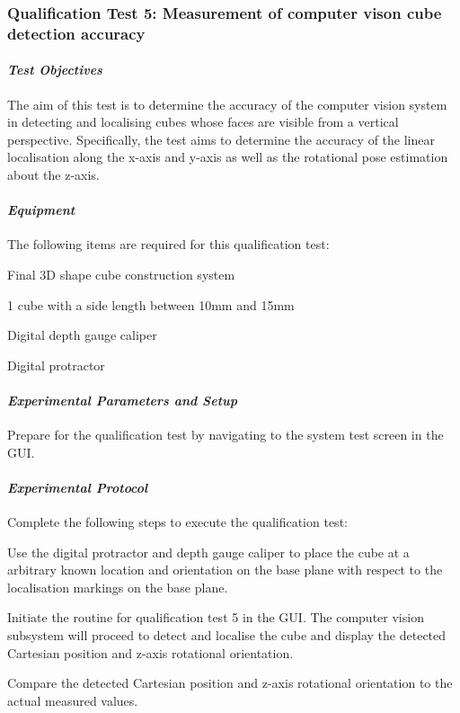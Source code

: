 \subsubsection{Qualification Test 5: Measurement of computer vison cube detection accuracy}

\paragraph{\textit{Test Objectives}}

The aim of this test is to determine the accuracy of the computer vision system in detecting and localising cubes whose faces are visible from a vertical perspective. Specifically, the test aims to determine the accuracy of the linear localisation along the x-axis and y-axis as well as the rotational pose estimation about the z-axis.

\paragraph{\textit{Equipment}}

The following items are required for this qualification test:

\begin{compactitem}
	\item Final 3D shape cube construction system
	\item 1 cube with a side length between 10mm and 15mm
	\item Digital depth gauge caliper
	\item Digital protractor
\end{compactitem}

\paragraph{\textit{Experimental Parameters and Setup}}

Prepare for the qualification test by navigating to the system test screen in the GUI.

\paragraph{\textit{Experimental Protocol}}

Complete the following steps to execute the qualification test:

\begin{compactenum}
	\item Use the digital protractor and depth gauge caliper to place the cube at a arbitrary known location and orientation on the base plane with respect to the localisation markings on the base plane.
	\item Initiate the routine for qualification test 5 in the GUI. The computer vision subsystem will proceed to detect and localise the cube and display the detected Cartesian position and z-axis rotational orientation.
	\item Compare the detected Cartesian position and z-axis rotational orientation to the actual measured values.
\end{compactenum}

